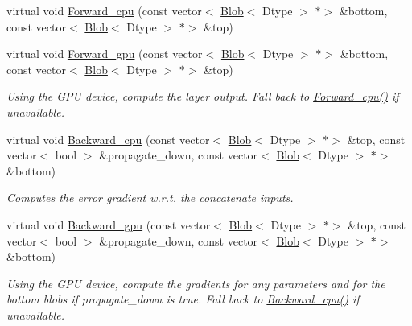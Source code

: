 \begin{DoxyCompactItemize}
\item 
virtual void \mbox{\hyperlink{classcaffe_1_1_concat_layer_a619c378faa120012f06bfc1065b89ae2}{Forward\+\_\+cpu}} (const vector$<$ \mbox{\hyperlink{classcaffe_1_1_blob}{Blob}}$<$ Dtype $>$ $\ast$$>$ \&bottom, const vector$<$ \mbox{\hyperlink{classcaffe_1_1_blob}{Blob}}$<$ Dtype $>$ $\ast$$>$ \&top)
\item 
\mbox{\label{classcaffe_1_1_concat_layer_ae86c2ad93bac4790fec2c9dcfcba269c}} 
virtual void \mbox{\hyperlink{classcaffe_1_1_concat_layer_ae86c2ad93bac4790fec2c9dcfcba269c}{Forward\+\_\+gpu}} (const vector$<$ \mbox{\hyperlink{classcaffe_1_1_blob}{Blob}}$<$ Dtype $>$ $\ast$$>$ \&bottom, const vector$<$ \mbox{\hyperlink{classcaffe_1_1_blob}{Blob}}$<$ Dtype $>$ $\ast$$>$ \&top)
\begin{DoxyCompactList}\small\item\em Using the G\+PU device, compute the layer output. Fall back to \mbox{\hyperlink{classcaffe_1_1_concat_layer_a619c378faa120012f06bfc1065b89ae2}{Forward\+\_\+cpu()}} if unavailable. \end{DoxyCompactList}\item 
virtual void \mbox{\hyperlink{classcaffe_1_1_concat_layer_a928a320b29e3f72ffcc661d00534f760}{Backward\+\_\+cpu}} (const vector$<$ \mbox{\hyperlink{classcaffe_1_1_blob}{Blob}}$<$ Dtype $>$ $\ast$$>$ \&top, const vector$<$ bool $>$ \&propagate\+\_\+down, const vector$<$ \mbox{\hyperlink{classcaffe_1_1_blob}{Blob}}$<$ Dtype $>$ $\ast$$>$ \&bottom)
\begin{DoxyCompactList}\small\item\em Computes the error gradient w.\+r.\+t. the concatenate inputs. \end{DoxyCompactList}\item 
\mbox{\label{classcaffe_1_1_concat_layer_ac26a8bdde04bc090183194972d524e09}} 
virtual void \mbox{\hyperlink{classcaffe_1_1_concat_layer_ac26a8bdde04bc090183194972d524e09}{Backward\+\_\+gpu}} (const vector$<$ \mbox{\hyperlink{classcaffe_1_1_blob}{Blob}}$<$ Dtype $>$ $\ast$$>$ \&top, const vector$<$ bool $>$ \&propagate\+\_\+down, const vector$<$ \mbox{\hyperlink{classcaffe_1_1_blob}{Blob}}$<$ Dtype $>$ $\ast$$>$ \&bottom)
\begin{DoxyCompactList}\small\item\em Using the G\+PU device, compute the gradients for any parameters and for the bottom blobs if propagate\+\_\+down is true. Fall back to \mbox{\hyperlink{classcaffe_1_1_concat_layer_a928a320b29e3f72ffcc661d00534f760}{Backward\+\_\+cpu()}} if unavailable. \end{DoxyCompactList}\item 

\end{DoxyCompactItemize}
